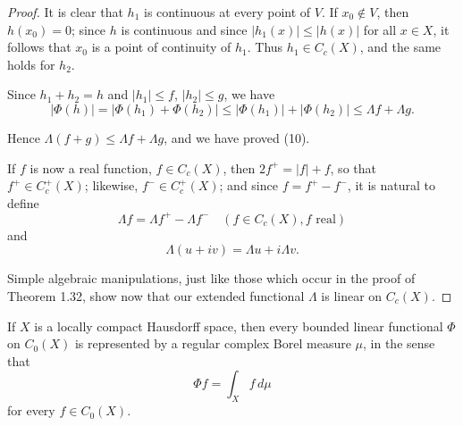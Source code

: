 \begin{proof}
  It is clear that $h_1$ is continuous at every point of $V$.
  If $x_0 \notin V$, then $h(x_0) = 0$; since $h$ is continuous and since $|h_1(x)| \leq |h(x)|$ for all $x \in X$, it follows that $x_0$ is a point of continuity of $h_1$.
  Thus $h_1 \in C_c(X)$, and the same holds for $h_2$.

  Since $h_1 + h_2 = h$ and $|h_1| \leq f$, $|h_2| \leq g$, we have
  \begin{equation}
    |\Phi(h)| = |\Phi(h_1) + \Phi(h_2)| \leq |\Phi(h_1)| + |\Phi(h_2)| \leq \Lambda f + \Lambda g.
  \end{equation}

  Hence $\Lambda(f + g) \leq \Lambda f + \Lambda g$, and we have proved (10).

  If $f$ is now a real function, $f \in C_c(X)$, then $2f^+ = |f| + f$, so that $f^+ \in C_c^+(X)$; likewise, $f^- \in C_c^+(X)$; and since $f = f^+ - f^-$, it is natural to define
  \begin{equation}
    \Lambda f = \Lambda f^+ - \Lambda f^- \quad (f \in C_c(X), f \text{ real}) \tag{13}
  \end{equation}
  and
  \begin{equation}
    \Lambda(u + iv) = \Lambda u + i\Lambda v. \tag{14}
  \end{equation}

  Simple algebraic manipulations, just like those which occur in the proof of Theorem 1.32, show now that our extended functional $\Lambda$ is linear on $C_c(X)$.
\end{proof}

\begin{theorem}[Rudin 6.19]
  \label{integral_rieszMeasure}
  If $X$ is a locally compact Hausdorff space, then every bounded linear functional $\Phi$ on $C_0(X)$ is represented by a regular complex Borel measure $\mu$, in the sense that
  \begin{equation}
    \Phi f = \int_X f \, d\mu \tag{1}
  \end{equation}
  for every $f \in C_0(X)$.
\end{theorem}

